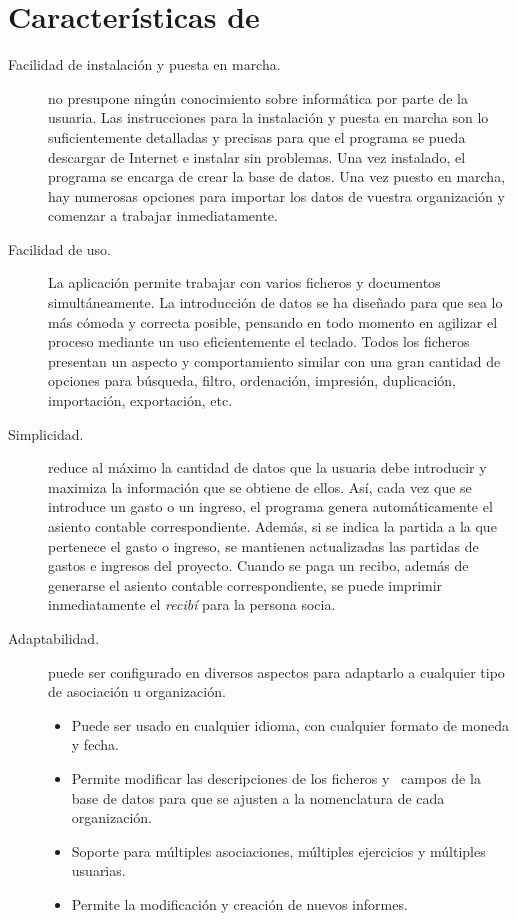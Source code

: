 \bigskip

\section{Características de \appname}

\begin{description}
 \item[Facilidad de instalación y puesta en marcha.]
\appname no presupone ningún conocimiento sobre informática por
parte de la usuaria. Las instrucciones para la instalación y puesta
en marcha son lo suficientemente detalladas y precisas para que el
programa se pueda descargar de Internet e instalar sin problemas. Una
vez instalado, el programa se encarga de crear la base de datos. Una
vez puesto en marcha, hay numerosas opciones para importar los datos de
vuestra organización y comenzar a trabajar inmediatamente.

\item[Facilidad de uso.]
La aplicación permite trabajar con varios ficheros y documentos
simultáneamente. La introducción de datos se ha diseñado para que
sea lo más cómoda y correcta posible, pensando en todo momento en
agilizar el proceso mediante un uso eficientemente el teclado. Todos
los ficheros presentan un aspecto y comportamiento similar con una gran
cantidad de opciones para búsqueda, filtro, ordenación,
impresión, duplicación, importación, exportación, etc.

\item[Simplicidad.]

\appname reduce al máximo la cantidad de datos que la usuaria debe
introducir y maximiza la información que se obtiene de ellos. Así,
cada vez que se introduce un gasto o un ingreso, el programa genera
automáticamente el asiento contable correspondiente. Además, si se
indica la partida a la que pertenece el gasto o ingreso, se mantienen
actualizadas las partidas de gastos e ingresos del proyecto. Cuando se
paga un recibo, además de generarse el asiento contable
correspondiente, se puede imprimir inmediatamente el \textit{recibí}
para la persona socia.


\item[Adaptabilidad.]
\appname puede ser configurado en diversos aspectos para adaptarlo a
cualquier tipo de asociación u organización. 

\liststyleLiii
\begin{itemize}
\item Puede ser usado en cualquier idioma, con cualquier formato de
moneda y fecha.
\item Permite modificar las descripciones de los ficheros y \ campos de
la base de datos para que se ajusten a la nomenclatura de cada
organización.
\item Soporte para múltiples asociaciones, múltiples ejercicios y
múltiples usuarias.
\item Permite la modificación y creación de nuevos informes.
\end{itemize}


\end{description}

